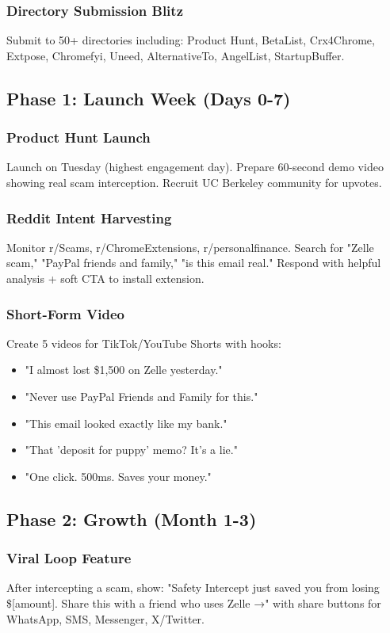 \documentclass[12pt]{article}
\begin{document}
\subsubsection{Directory Submission Blitz}
Submit to 50+ directories including: Product Hunt, BetaList, Crx4Chrome, Extpose, Chromefyi, Uneed, AlternativeTo, AngelList, StartupBuffer.

\subsection{Phase 1: Launch Week (Days 0-7)}

\subsubsection{Product Hunt Launch}
Launch on Tuesday (highest engagement day). Prepare 60-second demo video showing real scam interception. Recruit UC Berkeley community for upvotes.

\subsubsection{Reddit Intent Harvesting}
Monitor r/Scams, r/ChromeExtensions, r/personalfinance. Search for "Zelle scam," "PayPal friends and family," "is this email real." Respond with helpful analysis + soft CTA to install extension.

\subsubsection{Short-Form Video}
Create 5 videos for TikTok/YouTube Shorts with hooks:
\begin{itemize}
    \item "I almost lost \$1,500 on Zelle yesterday."
    \item "Never use PayPal Friends and Family for this."
    \item "This email looked exactly like my bank."
    \item "That 'deposit for puppy' memo? It's a lie."
    \item "One click. 500ms. Saves your money."
\end{itemize}

\subsection{Phase 2: Growth (Month 1-3)}

\subsubsection{Viral Loop Feature}
After intercepting a scam, show: "Safety Intercept just saved you from losing \$[amount]. Share this with a friend who uses Zelle →" with share buttons for WhatsApp, SMS, Messenger, X/Twitter.
\end{document}
